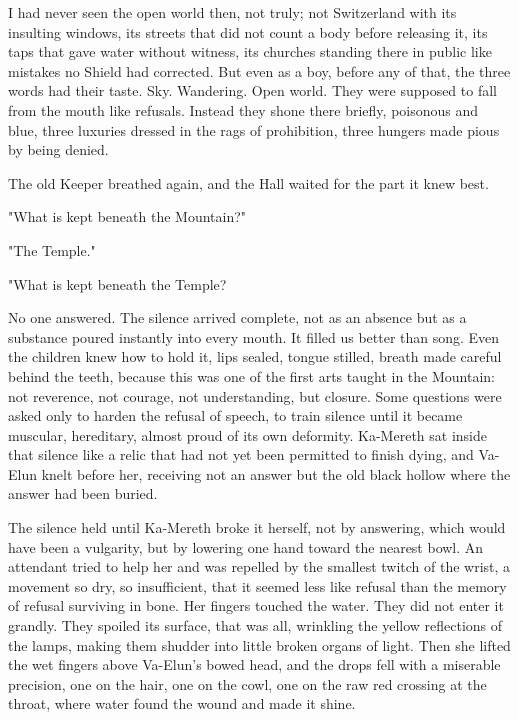 I had never seen the open world then, not truly; not Switzerland with its insulting windows, its streets that did not count 
a body before releasing it, its taps that gave water without witness, its churches standing there in public like mistakes 
no Shield had corrected. But even as a boy, before any of that, the three words had their taste. 
Sky. 
Wandering. 
Open world. 
They were supposed to fall from the mouth like refusals. 
Instead they shone there briefly, poisonous and blue, three luxuries dressed in the rags of prohibition, three hungers made pious by being denied.\par

The old Keeper breathed again, and the Hall waited for the part it knew best. \par

"What is kept beneath the Mountain?"\par

"The Temple."\par

"What is kept beneath the Temple? \par

No one answered. 
The silence arrived complete, not as an absence but as a substance poured instantly into every mouth. 
It filled us better than song. 
Even the children knew how to hold it, lips sealed, tongue stilled, breath made careful behind the teeth, because this was one of the first arts taught in the Mountain: 
not reverence, not courage, not understanding, but closure. 
Some questions were asked only to harden the refusal of speech, to train silence until it became muscular, hereditary, almost proud of its own deformity. 
Ka-Mereth sat inside that silence like a relic that had not yet been permitted to finish dying, and Va-Elun knelt before her, receiving not an answer but 
the old black hollow where the answer had been buried.\par


The silence held until Ka-Mereth broke it herself, not by answering, which would have been a vulgarity, but by lowering one hand toward the nearest bowl. 
An attendant tried to help her and was repelled by the smallest twitch of the wrist, a movement so dry, so insufficient, that it seemed less like refusal 
than the memory of refusal surviving in bone. 
Her fingers touched the water. They did not enter it grandly. They spoiled its surface, that was all, 
wrinkling the yellow reflections of the lamps, making them shudder into little broken organs of light. 
Then she lifted the wet fingers above Va-Elun’s bowed head, and the drops fell with a miserable precision, one on the hair, one on the cowl, 
one on the raw red crossing at the throat, where water found the wound and made it shine. \par

